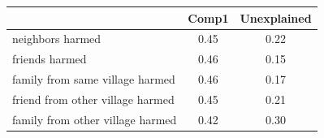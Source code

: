 {
\def\sym#1{\ifmmode^{#1}\else\(^{#1}\)\fi}
\begin{tabular}{l*{1}{cc}}
\toprule
                    &       Comp1& Unexplained\\
\midrule
neighbors harmed    &        0.45&        0.22\\
friends harmed      &        0.46&        0.15\\
family from same village harmed&        0.46&        0.17\\
friend from other village harmed&        0.45&        0.21\\
family from other village harmed&        0.42&        0.30\\
\bottomrule
\end{tabular}
}
